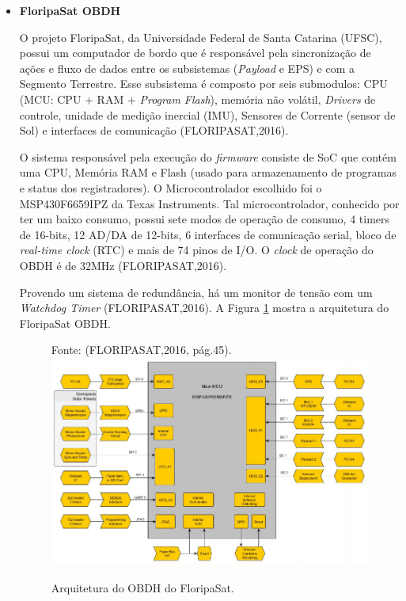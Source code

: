 \begin{itemize}
	
	\item \textbf{FloripaSat OBDH}
	
	O projeto FloripaSat, da Universidade Federal de Santa Catarina (UFSC), possui um  computador de bordo que é responsável pela sincronização de ações e fluxo de dados entre os subsistemas (\textit{Payload} e EPS) e com a Segmento Terrestre. Esse subsistema é composto por seis submodulos: CPU (MCU: CPU + RAM + \textit{Program Flash}), memória não volátil, \textit{Drivers} de controle, unidade de medição inercial (IMU), Sensores de Corrente (sensor de Sol) e interfaces de comunicação (FLORIPASAT,2016).
	
	O sistema responsável pela execução do \textit{firmware} consiste de SoC que contém uma CPU, Memória RAM e Flash (usado para armazenamento de programas e status dos registradores). O Microcontrolador escolhido foi o MSP430F6659IPZ da Texas Instruments. Tal microcontrolador, conhecido por ter um baixo consumo, possui sete modos de operação de consumo, 4 timers de 16-bits, 12 AD/DA de 12-bits, 6 interfaces de comunicação serial, bloco de \textit{real-time clock} (RTC) e mais de 74 pinos de I/O. O \textit{clock} de operação do OBDH é de 32MHz (FLORIPASAT,2016).
	
	Provendo um sistema de redundância, há um monitor de tensão com um \textit{Watchdog Timer} (FLORIPASAT,2016). A Figura \ref{fig12} mostra a arquitetura do FloripaSat OBDH.
	
	\begin{figure}[h]
		\footnotesize{
		\centering
		Fonte: (FLORIPASAT,2016, pág.45).\linebreak
		\includegraphics[keepaspectratio=true,scale=0.5]{figuras/floripasatobdh.PNG}
		\caption{Arquitetura do OBDH do FloripaSat.}
		\label{fig12}
	}
	\end{figure}
	\FloatBarrier
	

\end{itemize}
